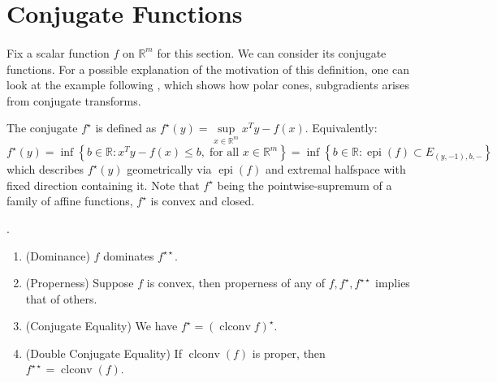 \section{Conjugate Functions}
\label{sect:025}

\paragraph{}Fix a scalar function $f$ on $\mathbb{R}^m$ for this section. We can consider its conjugate functions. For a possible explanation of the motivation of this definition, one can look at the example following , which shows how polar cones, subgradients arises from conjugate transforms.

\begin{defn}[Conjugate]\label{defn:025-conjugate}
	The conjugate $f^\star$ is defined as $f^\star(y)=\underset{x\in \mathbb{R}^m}{\operatorname{sup}}x^Ty-f(x)$. Equivalently:
	\[
		f^\star(y)=\inf\left\{b\in \mathbb{R}:x^Ty-f(x)\leq b,\;\text{for all }x\in \mathbb{R}^m\right\} =\inf\left\{b\in \mathbb{R}:\operatorname{epi}(f)\subset E_{(y,-1),b,-}\right\}
	\]
	which describes $f^\star(y)$ geometrically via $\operatorname{epi}(f)$ and extremal halfspace with fixed direction containing it.
	Note that $f^\star$ being the pointwise-supremum of a family of affine functions, $f^\star$ is convex and closed.
\end{defn}

\begin{prop}\label{prop:025-conjugacy-theorem}.
	\begin{enumerate}[label=(\alph*)]
		\item (Dominance) $f$ dominates $f^{\star\star}$.
		\item (Properness) Suppose $f$ is convex, then properness of any of $f,f^{\star},f^{\star\star}$ implies that of others.
		\item (Conjugate Equality) We have $f^\star=(\operatorname{clconv}f)^\star$.
		\item (Double Conjugate Equality) If $\operatorname{clconv}(f)$ is proper, then $f^{\star\star}=\operatorname{clconv}(f)$.
	\end{enumerate}
\end{prop}

